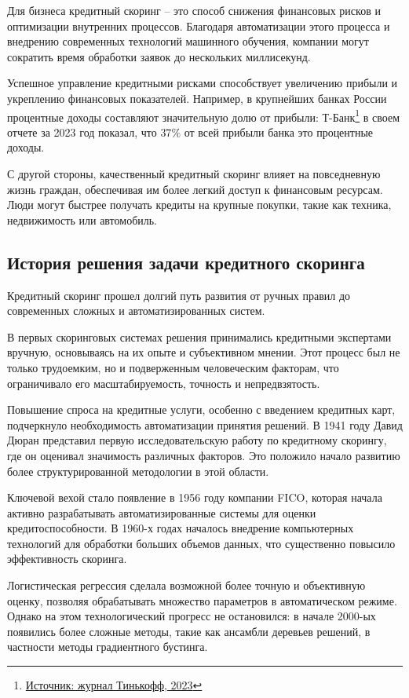 \documentclass[12pt]{article}
\begin{document}
Для бизнеса кредитный скоринг – это способ снижения финансовых рисков и оптимизации внутренних процессов. Благодаря автоматизации этого процесса и внедрению современных технологий машинного обучения, компании могут сократить время обработки заявок до нескольких миллисекунд. 

Успешное управление кредитными рисками способствует увеличению прибыли и укреплению финансовых показателей. Например, в крупнейших банках России процентные доходы составляют значительную долю от прибыли: Т-Банк\footnote{\href{https://journal.tinkoff.ru/news/review-bank-industry-2023/}{Источник: журнал Тинькофф, 2023}} в своем отчете за 2023 год показал, что $37\%$ от всей прибыли банка это процентные доходы.

С другой стороны, качественный кредитный скоринг влияет на повседневную жизнь граждан,  обеспечивая им более легкий доступ к финансовым ресурсам. Люди могут быстрее получать кредиты на крупные покупки, такие как техника, недвижимость или автомобиль.

\newpage
\subsection{История решения задачи кредитного скоринга}

Кредитный скоринг прошел долгий путь развития от ручных правил до современных сложных и автоматизированных систем. 

В первых скоринговых системах решения принимались кредитными экспертами вручную, основываясь на их опыте и субъективном мнении. Этот процесс был не только трудоемким, но и подверженным человеческим факторам, что ограничивало его масштабируемость, точность и непредвзятость.

Повышение спроса на кредитные услуги, особенно с введением кредитных карт, подчеркнуло необходимость автоматизации принятия решений. В 1941 году Давид Дюран представил первую исследовательскую работу по кредитному скорингу, где он оценивал значимость различных факторов. Это положило начало развитию более структурированной методологии в этой области.

Ключевой вехой стало появление в 1956 году компании FICO, которая начала активно разрабатывать автоматизированные системы для оценки кредитоспособности. В 1960-х годах началось внедрение компьютерных технологий для обработки больших объемов данных, что существенно повысило эффективность скоринга.

Логистическая регрессия сделала возможной более точную и объективную оценку, позволяя обрабатывать множество параметров в автоматическом режиме. Однако на этом технологический прогресс не остановился: в начале 2000-ых появились более сложные методы, такие как ансамбли деревьев решений, в частности методы градиентного бустинга.
\end{document}

